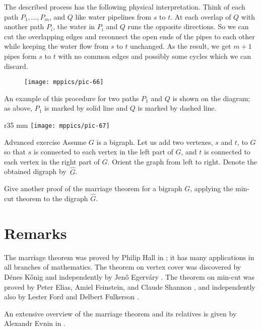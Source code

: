 The described process has the following physical interpretation.
Think of each path $P_1,\dots,P_m$, and $Q$ like water pipelines from $s$ to $t$.
At each overlap of $Q$ with another path $P_i$, the water in $P_i$ and $Q$ runs the opposite directions.
So we can cut the overlapping edges and reconnect the open ends of the pipes to each other while keeping the water flow from $s$ to $t$ unchanged.
As the result, we get $m+1$ pipes form $s$ to $t$ with no common edges and possibly some cycles which we can discard.
\begin{figure}[h!]%
\vskip-0mm
\centering
\texttt{[image: mppics/pic-66]}
\vskip0mm
\end{figure}
An example of this procedure for two paths $P_1$ and $Q$ is shown on the diagram; as above, $P_1$ is marked by solid line and $Q$ is marked by dashed line.

\begin{wrapfigure}{r}{35 mm}
\vskip-8mm
\centering
\texttt{[image: mppics/pic-67]}
\end{wrapfigure}

\begin{thm}{Advanced exercise}
Assume $G$ is a bigraph.
Let us add two vertexes, $s$ and $t$, to $G$ so that $s$ is connected to each vertex in the left part of $G$, and $t$ is connected to each vertex in the right part of $G$.
Orient the graph from left to right.
Denote the obtained digraph by~$\hat G$.

Give another proof of the marriage theorem for a bigraph $G$, applying the min-cut theorem to the digraph $\hat G$. 
\end{thm}


\section*{Remarks}

The marriage theorem was proved by Philip Hall in \cite{hall};
it has many applications in all branches of mathematics.
The theorem on vertex cover was discovered by D\'enes K\H{o}nig \cite{konig} and independently by Jen\H{o} Egerv\'ary \cite{egervary}.
The theorem on min-cut was proved by Peter Elias, Amiel Feinstein, and Claude Shannon \cite{EFS}, 
and independently also by Lester Ford and Delbert Fulkerson \cite{ford-fulkerson}.

An extensive overview of the marriage theorem and its relatives is given by Alexandr Evnin in \cite{evnin}.
